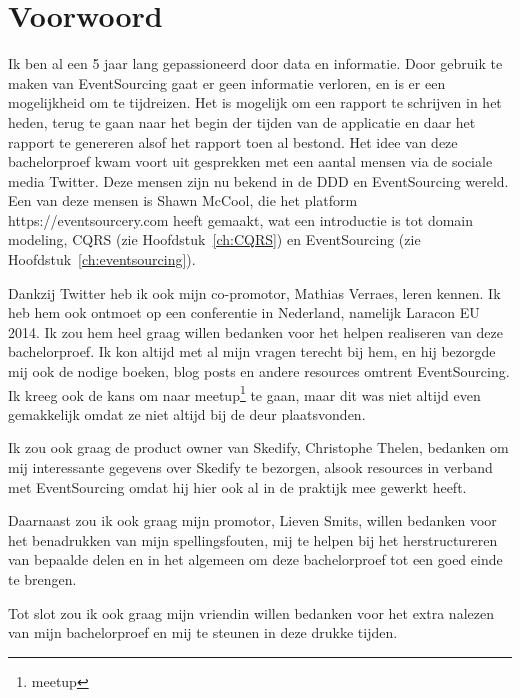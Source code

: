 
\chapter*{Voorwoord}
\label{ch:voorwoord}


Ik ben al een 5 jaar lang gepassioneerd door data en informatie. Door gebruik te maken van EventSourcing gaat er geen informatie verloren, en is er een mogelijkheid om te tijdreizen. Het is mogelijk om een rapport te schrijven in het heden, terug te gaan naar het begin der tijden van de applicatie en daar het rapport te genereren alsof het rapport toen al bestond. Het idee van deze bachelorproef kwam voort uit gesprekken met een aantal mensen via de sociale media Twitter. Deze mensen zijn nu bekend in de \gls{DDD} en EventSourcing wereld. Een van deze mensen is Shawn McCool, die het platform https://eventsourcery.com heeft gemaakt, wat een introductie is tot domain modeling, \gls{CQRS} (zie Hoofdstuk~\ref{ch:CQRS}) en EventSourcing (zie Hoofdstuk~\ref{ch:eventsourcing}).

Dankzij Twitter heb ik ook mijn co-promotor, Mathias Verraes, leren kennen. Ik heb hem ook ontmoet op een conferentie in Nederland, namelijk Laracon EU 2014. Ik zou hem heel graag willen bedanken voor het helpen realiseren van deze bachelorproef. Ik kon altijd met al mijn vragen terecht bij hem, en hij bezorgde mij ook de nodige boeken, blog posts en andere resources omtrent EventSourcing. Ik kreeg ook de kans om naar \gls{meetup}\footnote{\glsdesc{meetup}} te gaan, maar dit was niet altijd even gemakkelijk omdat ze niet altijd bij de deur plaatsvonden.

Ik zou ook graag de product owner van Skedify, Christophe Thelen, bedanken om mij interessante gegevens over Skedify te bezorgen, alsook resources in verband met EventSourcing omdat hij hier ook al in de praktijk mee gewerkt heeft.

Daarnaast zou ik ook graag mijn promotor, Lieven Smits, willen bedanken voor het benadrukken van mijn spellingsfouten, mij te helpen bij het herstructureren van bepaalde delen en in het algemeen om deze bachelorproef tot een goed einde te brengen.

Tot slot zou ik ook graag mijn vriendin willen bedanken voor het extra nalezen van mijn bachelorproef en mij te steunen in deze drukke tijden.